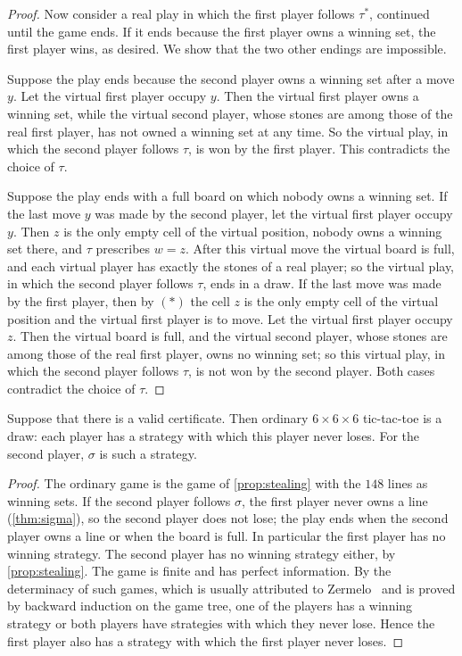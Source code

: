 \begin{proof}
Now consider a real play in which the first player follows $\tau^*$, continued until the game ends. If it
ends because the first player owns a winning set, the first player wins, as desired. We show that the two
other endings are impossible.

Suppose the play ends because the second player owns a winning set after a move $y$. Let the virtual first
player occupy $y$. Then the virtual first player owns a winning set, while the virtual second player, whose
stones are among those of the real first player, has not owned a winning set at any time. So the virtual
play, in which the second player follows $\tau$, is won by the first player. This contradicts the choice of
$\tau$.

Suppose the play ends with a full board on which nobody owns a winning set. If the last move $y$ was made
by the second player, let the virtual first player occupy $y$. Then $z$ is the only empty cell of the virtual
position, nobody owns a winning set there, and $\tau$ prescribes $w=z$. After this virtual move the virtual
board is full, and each virtual player has exactly the stones of a real player; so the virtual play, in
which the second player follows $\tau$, ends in a draw. If the last move was made by the first player, then
by $(\ast)$ the cell $z$ is the only empty cell of the virtual position and the virtual first player is to
move. Let the virtual first player occupy $z$. Then the virtual board is full, and the virtual second
player, whose stones are among those of the real first player, owns no winning set; so this virtual play, in
which the second player follows $\tau$, is not won by the second player. Both cases contradict the choice of
$\tau$.
\end{proof}

\begin{corollary}[Draw]\label{cor:draw}
Suppose that there is a valid certificate. Then ordinary $6\times6\times6$ tic-tac-toe is a draw: each player
has a strategy with which this player never loses. For the second player, $\sigma$ is such a strategy.
\end{corollary}

\begin{proof}
The ordinary game is the game of \cref{prop:stealing} with the $148$ lines as winning sets. If the
second player follows $\sigma$, the first player never owns a line (\cref{thm:sigma}), so the second
player does not lose; the play ends when the second player owns a line or when the board is full. In
particular the first player has no winning strategy. The second player has no winning strategy either, by
\cref{prop:stealing}. The game is finite and has perfect information. By the determinacy of such games,
which is usually attributed to Zermelo~\cite{Zermelo1913} and is proved by backward induction on the game
tree, one of the players has a winning strategy or both players have strategies with which they never
lose. Hence the first player also has a strategy with which
the first player never loses.
\end{proof}

